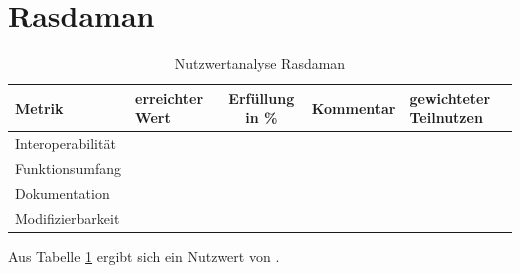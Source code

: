 

\section{Rasdaman}
\begin{table}[htp]
\centering
\small
\begin{tabular}{l|p{1.8cm}|c|p{3cm}|p{1.8cm}}
\textbf{Metrik} & \textbf{erreichter Wert} & \textbf{Erfüllung in \%} & \textbf{Kommentar} & \textbf{gewichteter Teilnutzen} \\ \hline
Interoperabilität &  &  &  &  \\ \hline
Funktionsumfang &  &  &  &  \\ \hline
Dokumentation &  &  &  &  \\ \hline
Modifizierbarkeit &  &  &  &  \\
\end{tabular}
\caption{Nutzwertanalyse Rasdaman}
\label{table:nutzwertanalyse-rasdaman}
\end{table}
Aus Tabelle \ref{table:nutzwertanalyse-rasdaman} ergibt sich ein Nutzwert von .

